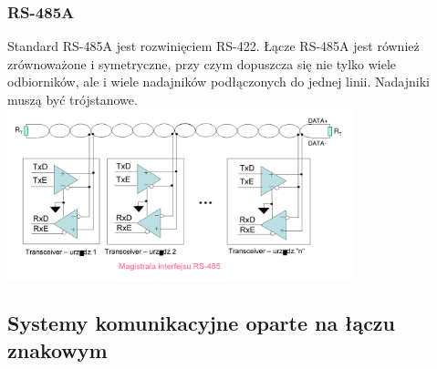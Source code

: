 		\subsubsection{RS-485A}
		Standard RS-485A jest rozwinięciem RS-422. Łącze RS-485A jest również zrównoważone i symetryczne, przy czym dopuszcza się nie tylko wiele odbiorników, ale i wiele nadajników podłączonych do jednej linii. Nadajniki muszą być trójstanowe.\\
		\includegraphics[width=10cm]{./wyklady/RS232_13_1.pdf}
	\subsection{Systemy komunikacyjne oparte na łączu znakowym}
